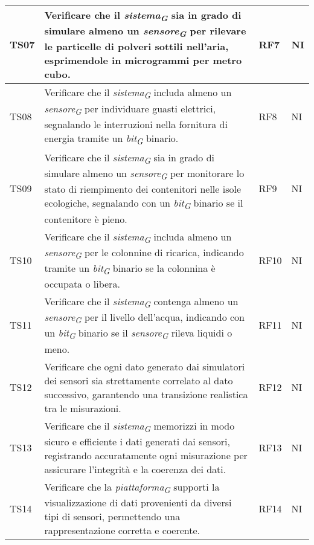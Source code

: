 \begin{longtable}{|C{1.9cm}|L{5cm}|C{2cm}|C{2cm}|}
    TS07 & Verificare che il \textit{sistema}\textsubscript{\textit{G}} sia in grado di simulare almeno un \textit{sensore}\textsubscript{\textit{G}} per rilevare le particelle di polveri sottili nell'aria, esprimendole in microgrammi per metro cubo. & RF7 & NI \\
    \hline

    TS08 & Verificare che il \textit{sistema}\textsubscript{\textit{G}} includa almeno un \textit{sensore}\textsubscript{\textit{G}} per individuare guasti elettrici, segnalando le interruzioni nella fornitura di energia tramite un \textit{bit}\textsubscript{\textit{G}} binario. & RF8 & NI \\
    \hline

    TS09 & Verificare che il \textit{sistema}\textsubscript{\textit{G}} sia in grado di simulare almeno un \textit{sensore}\textsubscript{\textit{G}} per monitorare lo stato di riempimento dei contenitori nelle isole ecologiche, segnalando con un \textit{bit}\textsubscript{\textit{G}} binario se il contenitore è pieno. & RF9 & NI \\
    \hline

    TS10 & Verificare che il \textit{sistema}\textsubscript{\textit{G}} includa almeno un \textit{sensore}\textsubscript{\textit{G}} per le colonnine di ricarica, indicando tramite un \textit{bit}\textsubscript{\textit{G}} binario se la colonnina è occupata o libera. & RF10 & NI \\
    \hline

    TS11 & Verificare che il \textit{sistema}\textsubscript{\textit{G}} contenga almeno un \textit{sensore}\textsubscript{\textit{G}} per il livello dell'acqua, indicando con un \textit{bit}\textsubscript{\textit{G}} binario se il \textit{sensore}\textsubscript{\textit{G}} rileva liquidi o meno. & RF11 & NI \\
    \hline

    TS12 & Verificare che ogni dato generato dai simulatori dei sensori sia strettamente correlato al dato successivo, garantendo una transizione realistica tra le misurazioni. & RF12 & NI \\
    \hline

    TS13 & Verificare che il \textit{sistema}\textsubscript{\textit{G}} memorizzi in modo sicuro e efficiente i dati generati dai sensori, registrando accuratamente ogni misurazione per assicurare l'integrità e la coerenza dei dati. & RF13 & NI \\
    \hline

    TS14 & Verificare che la \textit{piattaforma}\textsubscript{\textit{G}} supporti la visualizzazione di dati provenienti da diversi tipi di sensori, permettendo una rappresentazione corretta e coerente. & RF14 & NI \\
    \hline


\end{longtable}
